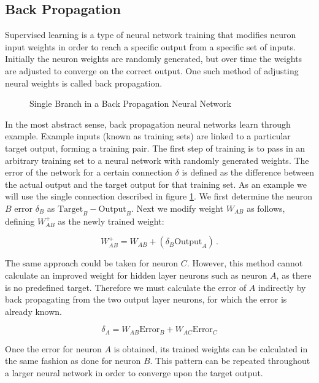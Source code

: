 \subsection{Back Propagation}

Supervised learning is a type of neural network training that modifies neuron input weights in order to reach a specific output from a specific set of inputs.  Initially the neuron weights are randomly generated, but over time the weights are adjusted to converge on the correct output.  One such method of adjusting neural weights is called back propagation. \cite{practical}

\begin{figure}[ht]
	\centering
	
	\caption{Single Branch in a Back Propagation Neural Network}
	\label{fig:backprop}
\end{figure}

In the most abstract sense, back propagation neural networks learn through example.  Example inputs (known as training sets) are linked to a particular target output, forming a training pair.  The first step of training is to pass in an arbitrary training set to a neural network with randomly generated weights.  The error of the network for a certain connection $\delta$ is defined as the difference between the actual output and the target output for that training set. As an example we will use the single connection described in figure \ref{fig:backprop}.  We first determine the neuron $B$ error $\delta_B$ as $\text{Target}_B - \text{Output}_B$.   Next we modify weight $W_{AB}$ as follows, defining $W_{AB}^{+}$ as the newly trained weight:

\begin{equation}
	W_{AB}^{+} = W_{AB} + (\delta_B \text{Output}_A)\,.
\end{equation}

The same approach could be taken for neuron $C$.  However, this method cannot calculate an improved weight for hidden layer neurons such as neuron $A$, as there is no predefined target.  Therefore we must calculate the error of $A$ indirectly by back propagating from the two output layer neurons, for which the error is already known.

\begin{equation}
	\delta_A = W_{AB}\text{Error}_B + W_{AC}\text{Error}_C
\end{equation}

Once the error for neuron $A$ is obtained, its trained weights can be calculated in the same fashion as done for neuron $B$.  This pattern can be repeated throughout a larger neural network in order to converge upon the target output.

